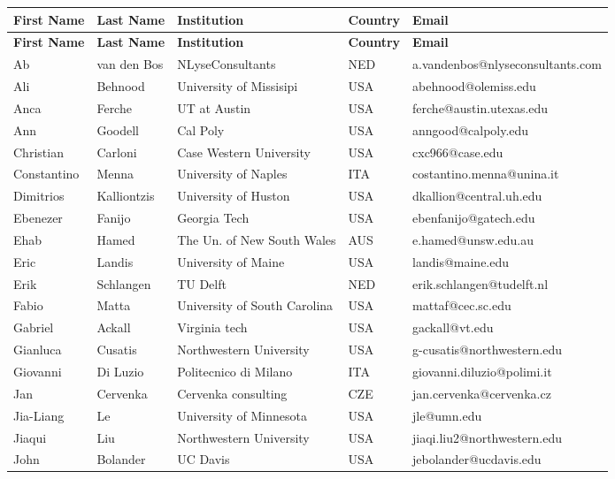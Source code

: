 \documentclass[11pt]{book}
\begin{document}
\begin{longtable}{p{}p{}p{}p{}p{}}
\hline
\textbf{First Name} &
\textbf{Last Name} &
\textbf{Institution} &
\textbf{Country} &
\textbf{Email} \\
\hline
\endfirsthead

\hline
\textbf{First Name} &
\textbf{Last Name} &
\textbf{Institution} &
\textbf{Country} &
\textbf{Email} \\
\hline
\endhead

Ab & van den Bos & NLyseConsultants & NED & a.vandenbos@nlyseconsultants.com \\
Ali & Behnood & University of Missisipi & USA & abehnood@olemiss.edu \\
Anca & Ferche & UT at Austin & USA & ferche@austin.utexas.edu \\
Ann & Goodell & Cal Poly & USA & anngood@calpoly.edu \\
Christian & Carloni & Case Western University & USA & cxc966@case.edu \\
Constantino & Menna & University of Naples & ITA & costantino.menna@unina.it \\
Dimitrios & Kalliontzis & University of Huston & USA & dkallion@central.uh.edu \\
Ebenezer & Fanijo & Georgia Tech & USA & ebenfanijo@gatech.edu \\
Ehab & Hamed & The Un. of New South Wales & AUS & e.hamed@unsw.edu.au \\
Eric & Landis & University of Maine & USA & landis@maine.edu \\
Erik & Schlangen & TU Delft & NED & erik.schlangen@tudelft.nl \\
Fabio & Matta & University of South Carolina & USA & mattaf@cec.sc.edu \\
Gabriel & Ackall & Virginia tech & USA & gackall@vt.edu \\
Gianluca & Cusatis & Northwestern University & USA & g-cusatis@northwestern.edu \\
Giovanni & Di Luzio & Politecnico di Milano & ITA & giovanni.diluzio@polimi.it \\
Jan & Cervenka & Cervenka consulting & CZE & jan.cervenka@cervenka.cz \\
Jia-Liang & Le & University of Minnesota & USA & jle@umn.edu \\
Jiaqui & Liu & Northwestern University & USA & jiaqi.liu2@northwestern.edu \\
John & Bolander & UC Davis & USA & jebolander@ucdavis.edu \\

\end{longtable}
\end{document}
